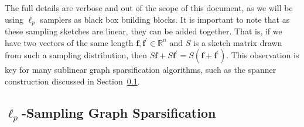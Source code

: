 \documentclass[10]{report}
\DeclareMathOperator*{\argmax}{arg\,max}
\newcommand{\algoname}[1]{\textnormal{\textsc{#1}}}
\begin{document}
The full details are verbose and out of the scope of this document, as we will be using $\ell_p$ samplers as black box building blocks.
%
It is important to note that as these sampling sketches are linear, they can be added together. 
That is, if we have two vectors of the same length $\mathbf{f}, \mathbf{f}^\prime \in \mathbb{R}^n$ and $S$ is a sketch matrix drawn from such a sampling distribution, then $S\mathbf{f} + S\mathbf{f}^\prime = S(\mathbf{f}+\mathbf{f}^\prime)$. 
This observation is key for many sublinear graph sparsification algorithms, such as the spanner construction discussed in  Section~\ref{sec:spanner}. 


\subsection{$\ell_p$-Sampling Graph Sparsification} \label{sec:spanner}
\end{document}
